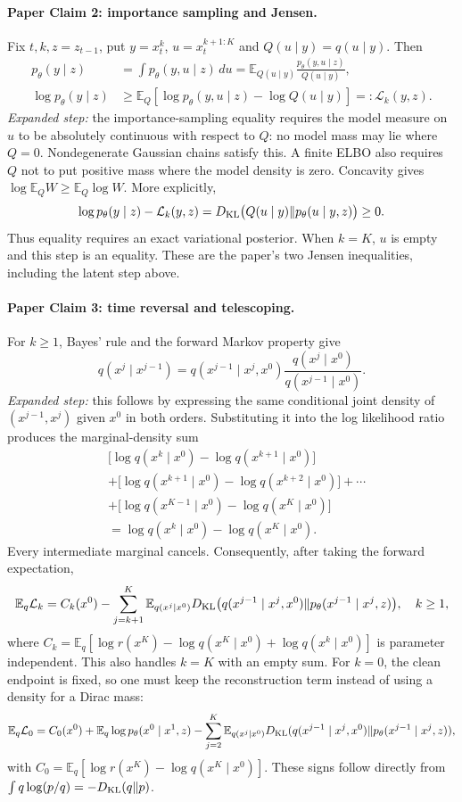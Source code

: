 \paragraph{Paper Claim 2: importance sampling and Jensen.}
Fix $t,k,z=z_{t-1}$, put $y=x_t^k$, $u=x_t^{k+1:K}$ and $Q(u\mid y)=q(u\mid y)$. Then
\begin{align*}
 p_\theta(y\mid z)&=\int p_\theta(y,u\mid z)\,du
 =\mathbb E_{Q(u\mid y)}\frac{p_\theta(y,u\mid z)}{Q(u\mid y)},\\
 \log p_\theta(y\mid z)&\geq
 \mathbb E_Q\left[\log p_\theta(y,u\mid z)-\log Q(u\mid y)\right]
 =:\mathcal L_k(y,z).
\end{align*}
\emph{Expanded step:} the importance-sampling equality requires the model measure on $u$ to be absolutely continuous with respect to $Q$: no model mass may lie where $Q=0$. Nondegenerate Gaussian chains satisfy this. A finite ELBO also requires $Q$ not to put positive mass where the model density is zero. Concavity gives $\log\mathbb E_Q W\geq\mathbb E_Q\log W$. More explicitly,
\[
 \log p_\theta(y\mid z)-\mathcal L_k(y,z)
 =D_{\rm KL}\bigl(Q(u\mid y)\Vert p_\theta(u\mid y,z)\bigr)\geq0.
\]
Thus equality requires an exact variational posterior. When $k=K$, $u$ is empty and this step is an equality. These are the paper's two Jensen inequalities, including the latent step above.

\paragraph{Paper Claim 3: time reversal and telescoping.}
For $k\geq1$, Bayes' rule and the forward Markov property give
\[
 q(x^j\mid x^{j-1})=
 q(x^{j-1}\mid x^j,x^0)\frac{q(x^j\mid x^0)}{q(x^{j-1}\mid x^0)}.
\]
\emph{Expanded step:} this follows by expressing the same conditional joint density of $(x^{j-1},x^j)$ given $x^0$ in both orders. Substituting it into the log likelihood ratio produces the marginal-density sum
\begin{align*}
 &\bigl[\log q(x^k\mid x^0)-\log q(x^{k+1}\mid x^0)\bigr]\\
 &+\bigl[\log q(x^{k+1}\mid x^0)-\log q(x^{k+2}\mid x^0)\bigr]+\cdots\\
 &+\bigl[\log q(x^{K-1}\mid x^0)-\log q(x^K\mid x^0)\bigr]\\
 &=\log q(x^k\mid x^0)-\log q(x^K\mid x^0).
\end{align*}
Every intermediate marginal cancels. Consequently, after taking the forward expectation,
\[
 \mathbb E_q\mathcal L_k=C_k(x^0)
 -\sum_{j=k+1}^K\mathbb E_{q(x^j\mid x^0)}
 D_{\rm KL}\bigl(q(x^{j-1}\mid x^j,x^0)\Vert
 p_\theta(x^{j-1}\mid x^j,z)\bigr),\quad k\geq1,
\]
where $C_k=\mathbb E_q[\log r(x^K)-\log q(x^K\mid x^0)+\log q(x^k\mid x^0)]$ is parameter independent. This also handles $k=K$ with an empty sum. For $k=0$, the clean endpoint is fixed, so one must keep the reconstruction term instead of using a density for a Dirac mass:
\[
 \mathbb E_q\mathcal L_0=C_0(x^0)+\mathbb E_q\log p_\theta(x^0\mid x^1,z)
 -\sum_{j=2}^K\mathbb E_{q(x^j\mid x^0)}D_{\rm KL}(q(x^{j-1}\mid x^j,x^0)\Vert p_\theta(x^{j-1}\mid x^j,z)),
\]
with $C_0=\mathbb E_q[\log r(x^K)-\log q(x^K\mid x^0)]$. These signs follow directly from $\int q\log(p/q)=-D_{\rm KL}(q\Vert p)$.

